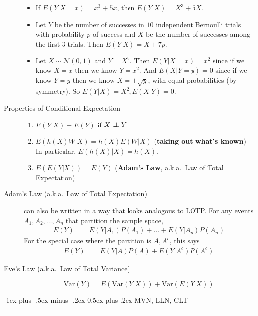 \documentclass[10pt,landscape]{article}
\makeatletter
\newcommand\independent{\protect\mathpalette{\protect\independenT}{\perp}}
\def\independenT#1#2{\mathrel{\setbox0\hbox{$#1#2$}%
    \copy0\kern-\wd0\mkern4mu\box0}}
\newcommand{\var}{\textrm{Var}}
\newcommand{\N}{\mathcal{N}}
\renewcommand{\section}{\@startsection{section}{1}{0mm}%
                                {-1ex plus -.5ex minus -.2ex}%
                                {0.5ex plus .2ex}%
                                {\normalfont\large\bfseries}}
\makeatother
\begin{document}
\begin{multicols*}{3}
\begin{description}
    \begin{itemize}
    \item If $E(Y|X=x) = x^3+5x$, then $E(Y|X) = X^3 + 5X$.
    \item Let $Y$ be the number of successes in $10$ independent Bernoulli trials with probability $p$ of success and $X$ be the number of successes among the first $3$ trials. Then $E(Y|X)=X+7p$.
    \item Let $X \sim \N(0,1)$ and $Y=X^2$. Then $E(Y|X=x) = x^2$ since if we know $X=x$ then we know $Y=x^2$. And $E(X|Y=y) = 0$ since if we know $Y=y$ then we know $X = \pm \sqrt{y}$, with equal probabilities (by symmetry). So $E(Y|X)=X^2, E(X|Y)=0$.  
    \end{itemize} 
    
        \item[Properties of Conditional Expectation] \quad
    \begin{enumerate}
        \item $E(Y|X) = E(Y)$ if $X \independent Y$
        \item $E(h(X)W|X) = h(X)E(W|X)$ (\textbf{taking out what's known}) \\
        In particular, $E(h(X)|X) = h(X)$.
        \item $E(E(Y|X)) = E(Y)$ (\textbf{Adam's Law}, a.k.a.~Law of Total Expectation)
    \end{enumerate}

    \item[Adam's Law (a.k.a.~Law of Total Expectation)]  can also be written in a way that looks analogous to LOTP. For any events $A_1, A_2, \dots, A_n$ that partition the sample space, 
        \begin{align*}
        E(Y) &= E(Y|A_1)P(A_1) + \dots + E(Y|A_n)P(A_n)
    \end{align*}
    For the special case where the partition is $A, A^c$, this says
        \begin{align*}
            E(Y) &= E(Y|A)P(A) + E(Y|A^c)P(A^c)
    \end{align*}

    \item[Eve's Law (a.k.a.~Law of Total Variance)] \quad
    \[\var(Y) = E(\var(Y|X)) + \var(E(Y|X))\]
\end{description}


\section{MVN, LLN, CLT}\smallskip \hrule height 2pt \smallskip


\end{multicols*}
\end{document}
